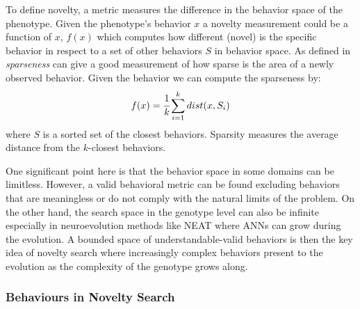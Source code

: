 \documentclass{sig-alternate}
\begin{document}
To define novelty, a metric measures the difference in the behavior space of the phenotype. Given the phenotype's behavior $x$ a novelty measurement could be a function of $x$, $f(x)$ which computes how different (novel) is the specific behavior in respect to a set of other behaviors $S$ in behavior space.  As defined in~\cite{lehman2008exploiting,lehman2011abandoning} \emph{sparseness} can give a good measurement of how sparse is the area of a newly observed behavior. Given the behavior we can compute the sparseness by:
\begin{equation}
\label{sparsenessEquation}
f(x) = \cfrac{1}{k} \sum_{i=1}^{k} dist(x, S_i)
\end{equation}
where $S$ is a sorted set of the closest behaviors. Sparsity measures the average distance from the $k$-closest behaviors.

One significant point here is that the behavior space in some domains can be limitless. However, a valid behavioral metric can be found excluding behaviors that are meaningless or do not comply with the natural limits of the problem. On the other hand, the search space in the genotype level can also be infinite especially in neuroevolution methods like NEAT where ANNs can grow during the evolution. A bounded space of understandable-valid behaviors is then the key idea of novelty search where increasingly complex behaviors present to the evolution as the complexity of the genotype grows along.

\subsubsection*{Behaviours in Novelty Search}
\end{document}
